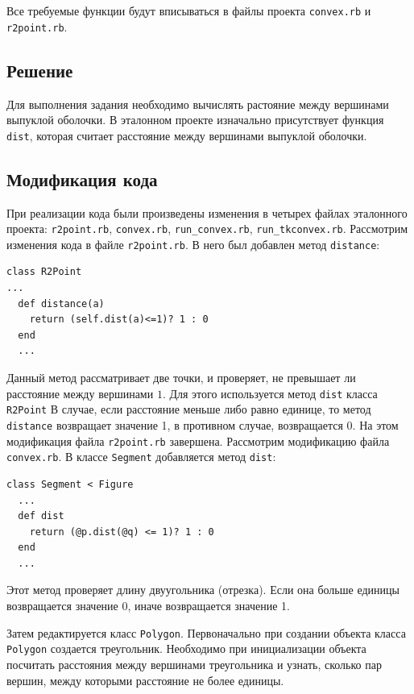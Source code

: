 \sloppy Все требуемые функции будут вписываться в файлы проекта \texttt{convex.rb} и \texttt{r2point.rb}.

\subsection{Решение}

Для выполнения задания необходимо вычислять растояние между вершинами выпуклой оболочки. В эталонном проекте изначально присутствует функция \texttt{dist}, которая считает расстояние между вершинами выпуклой оболочки.
\subsection{Модификация кода}
При реализации кода были произведены изменения в четырех файлах эталонного проекта: \texttt{r2point.rb}, \texttt{convex.rb}, \texttt{run\_convex.rb}, \texttt{run\_tkconvex.rb}.
Рассмотрим  изменения кода в файле \texttt{r2point.rb}. В него был добавлен метод \texttt{distance}:

\begin{small}
\begin{verbatim}
class R2Point
...
  def distance(a)
    return (self.dist(a)<=1)? 1 : 0
  end
  ...
\end{verbatim}
\end{small}

Данный метод рассматривает две точки, и проверяет, не превышает ли расстояние между вершинами $1$. Для этого используется метод \texttt{dist} класса \texttt{R2Point}  В случае, если расстояние меньше либо равно единице, то метод \texttt{distance} возвращает значение 1, в противном случае, возвращается 0. На этом модификация файла \texttt{r2point.rb} завершена.
\newpage
Рассмотрим модификацию файла \texttt{convex.rb}. В классе \texttt{Segment} добавляется метод \texttt{dist}:

\begin{small}
\begin{verbatim}
class Segment < Figure
  ...
  def dist
    return (@p.dist(@q) <= 1)? 1 : 0
  end
  ...
\end{verbatim}
\end{small}

Этот метод проверяет длину двуугольника (отрезка). Если она больше единицы возвращается значение 0, иначе возвращается значение 1.

Затем редактируется класс \texttt{Polygon}. Первоначально при создании объекта класса \texttt{Polygon} создается треугольник. Необходимо при инициализации объекта посчитать расстояния между вершинами треугольника и узнать, сколько пар вершин, между которыми расстояние не более единицы.

